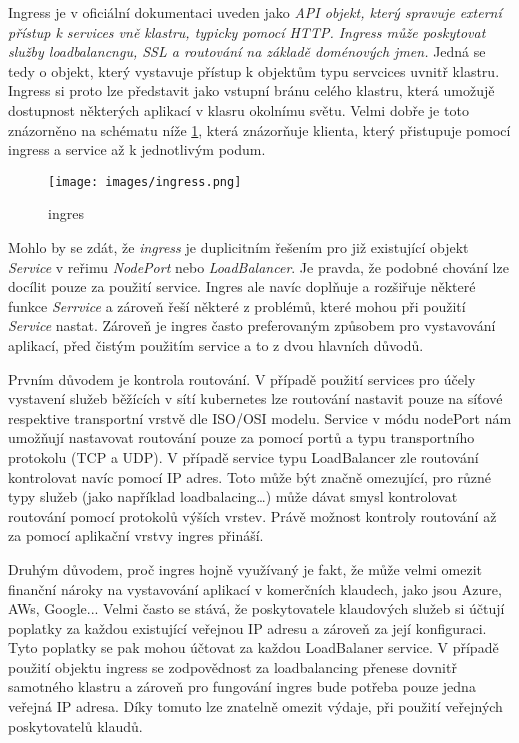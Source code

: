 Ingress je v oficiální dokumentaci uveden jako \textit{API objekt, který spravuje externí přístup k services vně klastru, typicky pomocí HTTP. Ingress může poskytovat služby loadbalancngu, SSL a routování na základě doménových jmen.} \cite{a2023_ingress} Jedná se tedy o objekt, který vystavuje přístup k objektům typu servcices uvnitř klastru. Ingress si proto lze představit jako vstupní bránu celého klastru, která umožujě dostupnost některých aplikací v klasru okolnímu světu. Velmi dobře je toto znázorněno na schématu níže \ref{fig:ingres}, která znázorňuje klienta, který přistupuje pomocí ingress a service až k jednotlivým podum. 

\begin{figure}[!ht]
    \centering
    \texttt{[image: images/ingress.png]}
    \caption{ingres}
    \label{fig:ingres}
\end{figure}

Mohlo by se zdát, že \textit{ingress} je duplicitním řešením pro již existující objekt \textit{Service} v reřimu \textit{NodePort} nebo \textit{LoadBalancer}. Je pravda, že podobné chování lze docílit pouze za použití service. Ingres ale navíc doplňuje a rozšiřuje některé funkce \textit{Serrvice} a zároveň řeší některé z problémů, které mohou při použití \textit{Service} nastat. Zároveň je ingres často preferovaným způsobem pro vystavování aplikací, před čistým použitím service a to z dvou hlavních důvodů.

Prvním důvodem je kontrola routování. V případě použití services pro účely vystavení služeb běžících v sítí kubernetes lze routování nastavit pouze na síťové respektive transportní vrstvě dle ISO/OSI modelu. Service v módu nodePort nám umožňují nastavovat routování pouze za pomocí portů a typu transportního protokolu (TCP a UDP). V případě service typu LoadBalancer zle routování kontrolovat navíc pomocí IP adres. Toto může být značně omezující, pro různé typy služeb (jako například loadbalacing\ldots) může dávat smysl kontrolovat routování pomocí protokolů výších vrstev. Právě možnost kontroly routování až za pomocí aplikační vrstvy ingres přináší.

Druhým důvodem, proč ingres hojně využívaný je fakt, že může velmi omezit finanční nároky na vystavování aplikací v komerčních klaudech, jako jsou Azure, AWs, Google... Velmi často se stává, že poskytovatele klaudových služeb si účtují poplatky za každou existující veřejnou IP adresu a zároveň za její konfiguraci. Tyto poplatky se pak mohou účtovat za každou LoadBalaner service. V případě použití objektu ingress se zodpovědnost za loadbalancing přenese dovnitř samotného klastru a zároveň pro fungování ingres bude potřeba pouze jedna veřejná IP adresa. Díky tomuto lze znatelně omezit výdaje, při použití veřejných poskytovatelů klaudů.

